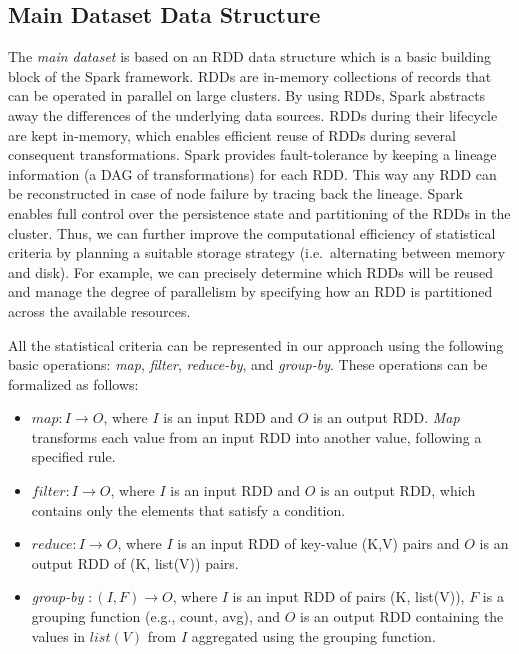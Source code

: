 \subsection{Main Dataset Data Structure}
The \emph{main dataset} is based on an \gls{RDD} data structure which is a basic building block of the Spark framework.
\gls{RDD}s are in-memory collections of records that can be operated in parallel on large clusters.
By using \gls{RDD}s, Spark abstracts away the differences of the underlying data sources.
\gls{RDD}s during their lifecycle are kept in-memory, which enables efficient reuse of \gls{RDD}s during several consequent transformations.
Spark provides fault-tolerance by keeping a lineage information (a \gls{DAG} of transformations) for each \gls{RDD}.
This way any \gls{RDD} can be reconstructed in case of node failure by tracing back the lineage.
Spark enables full control over the persistence state and partitioning of the \gls{RDD}s in the cluster.
Thus, we can further improve the computational efficiency of statistical criteria by planning a suitable storage strategy (i.e.~alternating between memory and disk).
For example, we can precisely determine which \gls{RDD}s will be reused and manage the degree of parallelism by specifying how an \gls{RDD} is partitioned across the available resources.

\begin{definition}
\label{def:basicdefination}
All the statistical criteria can be represented in our approach using the following basic operations: \textit{map}, \textit{filter}, \textit{reduce-by}, and \textit{group-by}.
These operations can be formalized as follows:
\begin{itemize}
    \item $map: I \rightarrow O$, where $I$ is an input \gls{RDD} and $O$ is an output \gls{RDD}. \textit{Map} transforms each value from an input RDD into another value, following a specified rule. %
    \item $filter: I \rightarrow O$, where $I$ is an input \gls{RDD} and $O$ is an output \gls{RDD}, which contains only the elements that satisfy a condition. 
    \item $reduce: I \rightarrow O$, where $I$ is an input \gls{RDD} of key-value (K,V) pairs and $O$ is an output \gls{RDD} of (K, list(V)) pairs.
    
    \item \textit{group-by} $: (I, F) \rightarrow O$, where $I$ is an input \gls{RDD} of pairs (K, list(V)), $F$ is a grouping function (e.g., count, avg), and $O$ is an output \gls{RDD} containing the values in $list(V)$ from $I$ aggregated using the grouping function.
    
\end{itemize}
\end{definition}

